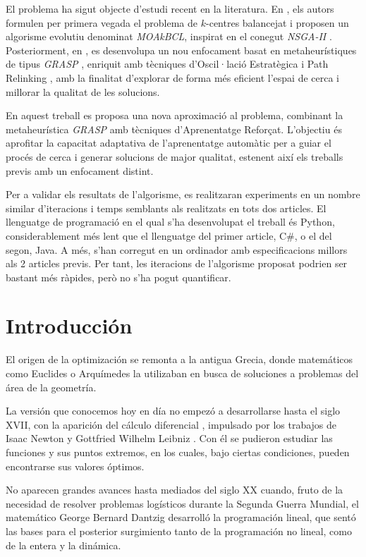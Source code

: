 \documentclass[12pt,a4paper]{book}
\begin{document}
El problema ha sigut objecte d'estudi recent en la literatura. En \cite{k-balanced_1}, els autors formulen per primera vegada el problema de $k$-centres balancejat i proposen un algorisme evolutiu denominat \textit{MOAkBCL}, inspirat en el conegut \textit{NSGA-II} \citep{NSGA-II}. Posteriorment, en \cite{k-Balanced_2}, es desenvolupa un nou enfocament basat en metaheurístiques de tipus \textit{GRASP} \citep{GRASP}, enriquit amb tècniques d'Oscil·lació Estratègica \citep{oscillation} i Path Relinking \citep{path_relinking}, amb la finalitat d'explorar de forma més eficient l'espai de cerca i millorar la qualitat de les solucions.

En aquest treball es proposa una nova aproximació al problema, combinant la metaheurística \textit{GRASP} amb tècniques d'Aprenentatge Reforçat. L'objectiu és aprofitar la capacitat adaptativa de l'aprenentatge automàtic per a guiar el procés de cerca i generar solucions de major qualitat, estenent així els treballs previs amb un enfocament distint.

Per a validar els resultats de l'algorisme, es realitzaran experiments en un nombre similar d'iteracions i temps semblants als realitzats en tots dos articles. El llenguatge de programació en el qual s'ha desenvolupat el treball és Python, considerablement més lent que el llenguatge del primer article, C\#, o el del segon, Java. A més, s'han corregut en un ordinador amb especificacions millors als 2 articles previs. Per tant, les iteracions de l'algorisme proposat podrien ser bastant més ràpides, però no s'ha pogut quantificar.
\newpage
 
\chapter{Introducción}

El origen de la optimización se remonta a la antigua Grecia, donde matemáticos como Euclides o Arquímedes la utilizaban en busca de soluciones a problemas del área de la geometría.

La versión que conocemos hoy en día no empezó a desarrollarse hasta el siglo XVII, con la aparición del cálculo diferencial \citep{calculo_diferencial}, impulsado por los trabajos de Isaac Newton y Gottfried Wilhelm Leibniz \citep{Leibniz}. Con él se pudieron estudiar las funciones y sus puntos extremos,
en los cuales, bajo ciertas condiciones, pueden encontrarse sus valores óptimos.

No aparecen grandes avances hasta mediados del siglo XX cuando, fruto de la necesidad de resolver problemas logísticos durante la Segunda Guerra Mundial, el matemático George Bernard Dantzig \citep{Dantzig} desarrolló la programación lineal, que sentó las bases para el posterior surgimiento tanto de la programación no lineal, como de la entera y la dinámica.
\end{document}
